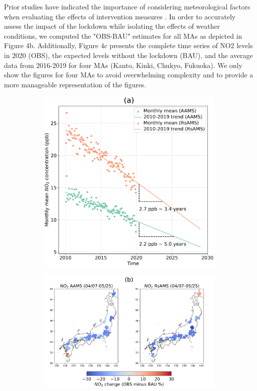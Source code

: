 Prior studies have indicated the importance of considering meteorological factors when evaluating the effects of intervention measures \citep{ordonez2020early,grange2021covid,shi2021abrupt}. In order to accurately assess the impact of the lockdown while isolating the effects of weather conditions, we computed the "OBS-BAU" estimates for all MAs as depicted in Figure 4b. Additionally, Figure 4c presents the complete time series of NO2 levels in 2020 (OBS), the expected levels without the lockdown (BAU), and the average data from 2016-2019 for four MAs (Kanto, Kinki, Chukyo, Fukuoka). We only show the figures for four MAs to avoid overwhelming complexity and to provide a more manageable representation of the figures. \par

\begin{figure}[tbh!]
    \centering
    \begin{subfigure}{.5\textwidth}
      \centering
      \includegraphics[width=\textwidth]{figs/chap4/fig4a.png}
      \label{fig:chap4_fig4a}
    \end{subfigure}%
    \begin{subfigure}{.5\textwidth}
      \centering
      \includegraphics[width=\textwidth]{figs/chap4/fig4b.png}

\end{subfigure}
\end{figure}
